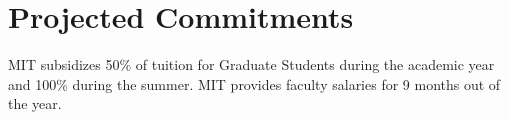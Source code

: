 \newpage

\section*{Projected Commitments}

MIT subsidizes 50\% of tuition for Graduate Students during the academic
year and 100\% during the summer.  MIT provides faculty salaries for 9
months out of the year.

